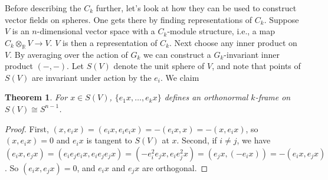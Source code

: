 \documentclass{article}
\newcommand{\R}{\mathbb{R}}
\newtheorem{thm}{Theorem}[section]
\begin{document}
Before describing the $C_k$ further, let's look at how they can be used to construct vector fields on spheres.  One gets there by finding representations of $C_k$. Suppose $V$ is an $n$-dimensional vector space with a $C_k$-module structure, i.e., a map $C_k \otimes_\R V \to V$.  $V$ is then a representation of $C_k$.  Next choose any inner product on $V$.  By averaging over the action of $G_k$ we can construct a $G_k$-invariant inner product $(-, -)$.  Let $S(V)$ denote the unit sphere of $V$, and note that points of $S(V)$ are invariant under action by the $e_i$.  We claim
\begin{thm}
For $x \in S(V)$, $\{e_1 x, \ldots, e_k x\}$ defines an orthonormal $k$-frame on $S(V) \cong S^{n-1}$.
\end{thm}
\begin{proof}
First, $(x, e_i x) = (e_i x, e_i e_i x) = -(e_i x, x) = -(x, e_i x)$, so $(x, e_i x) = 0$ and $e_i x$ is tangent to $S(V)$ at $x$.  Second, if $i \ne j$, we have $(e_i x, e_j x) = (e_i e_j e_i x, e_i e_j e_j x) = (-e_i^2 e_j x, e_i e_j^2 x) = (e_j x, (-e_i x)) = -(e_i x, e_j x)$.  So $(e_i x, e_j x) = 0$, and $e_i x$ and $e_j x$ are orthogonal.
\end{proof}
\end{document}
